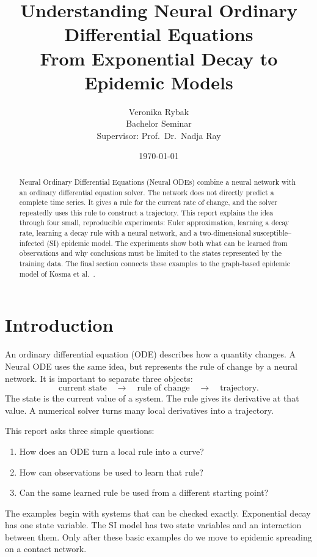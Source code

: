 \documentclass[11pt,a4paper]{article}
\title{Understanding Neural Ordinary Differential Equations\\\large From Exponential Decay to Epidemic Models}
\author{Veronika Rybak\\Bachelor Seminar\\Supervisor: Prof.\ Dr.\ Nadja Ray}
\date{\today}
\begin{document}
\maketitle

\begin{abstract}
Neural Ordinary Differential Equations (Neural ODEs) combine a neural network
with an ordinary differential equation solver. The network does not directly
predict a complete time series. It gives a rule for the current rate of change,
and the solver repeatedly uses this rule to construct a trajectory. This report
explains the idea through four small, reproducible experiments: Euler
approximation, learning a decay rate, learning a decay rule with a neural
network, and a two-dimensional susceptible--infected (SI) epidemic model. The
experiments show both what can be learned from observations and why conclusions
must be limited to the states represented by the training data. The final
section connects these examples to the graph-based epidemic model of Kosma et
al.\ \cite{kosma2023}.
\end{abstract}

\tableofcontents
\newpage

\section{Introduction}

An ordinary differential equation (ODE) describes how a quantity changes. A
Neural ODE uses the same idea, but represents the rule of change by a neural
network. It is important to separate three objects:
\[
\text{current state}\quad\longrightarrow\quad
\text{rule of change}\quad\longrightarrow\quad
\text{trajectory}.
\]
The state is the current value of a system. The rule gives its derivative at
that value. A numerical solver turns many local derivatives into a trajectory.

This report asks three simple questions:
\begin{enumerate}[label=\arabic*.]
\item How does an ODE turn a local rule into a curve?
\item How can observations be used to learn that rule?
\item Can the same learned rule be used from a different starting point?
\end{enumerate}
The examples begin with systems that can be checked exactly. Exponential decay
has one state variable. The SI model has two state variables and an interaction
between them. Only after these basic examples do we move to epidemic spreading
on a contact network.
\end{document}
